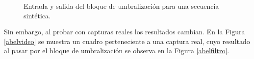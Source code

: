 \begin{figure}[ht!]
         \hspace{-1cm}
       \hspace{1 mm}
  \caption{Entrada y salida del bloque de umbralización para una secuencia sintética.}
      \label{resUmbralizacion}
\end{figure}

Sin embargo, al probar con capturas reales los resultados cambian. En la Figura \ref{abelvideo} se muestra un cuadro perteneciente a una captura real, cuyo resultado al pasar por el bloque de umbralización se observa en la Figura \ref{abelfiltro}. 

